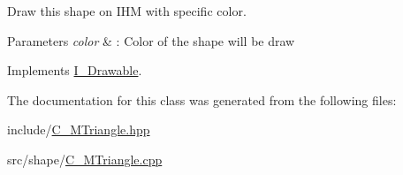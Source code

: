 Draw this shape on I\+HM with specific color. 


\begin{DoxyParams}{Parameters}
{\em color} & \+: Color of the shape will be draw \\
\hline
\end{DoxyParams}


Implements \hyperlink{classI__Drawable_a25f6474325614c451a91f019e5fe8010}{I\+\_\+\+Drawable}.



The documentation for this class was generated from the following files\+:\begin{DoxyCompactItemize}
\item 
include/\hyperlink{C__MTriangle_8hpp}{C\+\_\+\+M\+Triangle.\+hpp}\item 
src/shape/\hyperlink{C__MTriangle_8cpp}{C\+\_\+\+M\+Triangle.\+cpp}\end{DoxyCompactItemize}
